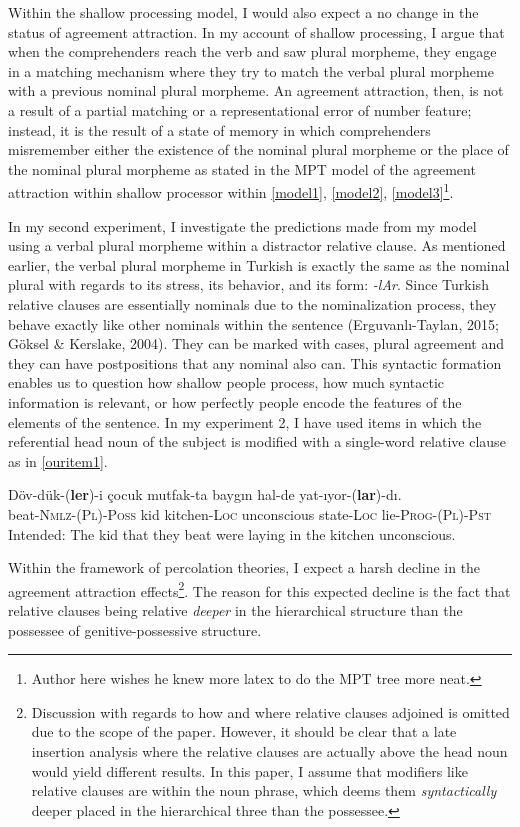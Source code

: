 \documentclass[doc]{apa6}
\let\rmarkdownfootnote\footnote%
\def\footnote{\protect\rmarkdownfootnote}
\begin{document}
Within the shallow processing model, I would also expect a no change in the status of agreement attraction. In my account of shallow processing, I argue that when the comprehenders reach the verb and saw plural morpheme, they engage in a matching mechanism where they try to match the verbal plural morpheme with a previous nominal plural morpheme. An agreement attraction, then, is not a result of a partial matching or a representational error of number feature; instead, it is the result of a state of memory in which comprehenders misremember either the existence of the nominal plural morpheme or the place of the nominal plural morpheme as stated in the MPT model of the agreement attraction within shallow processor within \autoref{model1}, \autoref{model2}, \autoref{model3}\footnote{Author here wishes he knew more latex to do the MPT tree more neat.}.

In my second experiment, I investigate the predictions made from my model using a verbal plural morpheme within a distractor relative clause. As mentioned earlier, the verbal plural morpheme in Turkish is exactly the same as the nominal plural with regards to its stress, its behavior, and its form: \emph{-lAr}. Since Turkish relative clauses are essentially nominals due to the nominalization process, they behave exactly like other nominals within the sentence (Erguvanlı-Taylan, 2015; Göksel \& Kerslake, 2004). They can be marked with cases, plural agreement and they can have postpositions that any nominal also can. This syntactic formation enables us to question how shallow people process, how much syntactic information is relevant, or how perfectly people encode the features of the elements of the sentence. In my experiment 2, I have used items in which the referential head noun of the subject is modified with a single-word relative clause as in \autoref{ouritem1}.

\begin{exe}
  \ex \label{ouritem1}
      \gll Döv-dük-(\textbf{ler})-i çocuk mutfak-ta baygın hal-de yat-ıyor-(\textbf{lar})-dı.\\
  beat-\textsc{Nmlz}-(\textsc{Pl})-\textsc{Poss} kid kitchen-\textsc{Loc} unconscious state-\textsc{Loc} lie-\textsc{Prog}-(\textsc{Pl})-\textsc{Pst}\\
      \glt Intended: The kid that they beat were laying in the kitchen unconscious.
\end{exe}

Within the framework of percolation theories, I expect a harsh decline in the agreement attraction effects\footnote{Discussion with regards to how and where relative clauses adjoined is omitted due to the scope of the paper. However, it should be clear that a late insertion analysis where the relative clauses are actually above the head noun would yield different results. In this paper, I assume that modifiers like relative clauses are within the noun phrase, which deems them \textit{syntactically} deeper placed in the hierarchical three than the possessee.}. The reason for this expected decline is the fact that relative clauses being relative \emph{deeper} in the hierarchical structure than the possessee of genitive-possessive structure.
\end{document}
